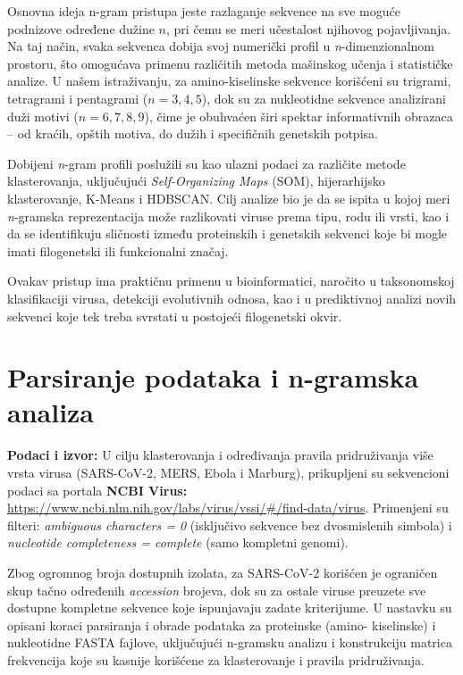 \documentclass[a4paper,12pt]{article}
\begin{document}
Osnovna ideja n-gram pristupa jeste razlaganje sekvence na sve moguće podnizove određene dužine $n$, pri čemu se meri učestalost njihovog pojavljivanja. 
Na taj način, svaka sekvenca dobija svoj numerički profil u \emph{n}-dimenzionalnom prostoru, što omogućava primenu različitih metoda mašinskog učenja i statističke analize.
U našem istraživanju, za amino-kiselinske sekvence korišćeni su trigrami, tetragrami i pentagrami ($n = 3,4,5$), dok su za nukleotidne sekvence analizirani duži motivi ($n = 6,7,8,9$), 
čime je obuhvaćen širi spektar informativnih obrazaca – od kraćih, opštih motiva, do dužih i specifičnih genetskih potpisa.

Dobijeni \emph{n}-gram profili poslužili su kao ulazni podaci za različite metode klasterovanja, uključujući \textit{Self-Organizing Maps} (SOM), hijerarhijsko klasterovanje, K-Means i HDBSCAN. 
Cilj analize bio je da se ispita u kojoj meri \emph{n}-gramska reprezentacija može razlikovati viruse prema tipu, rodu ili vrsti, kao i da se identifikuju sličnosti između proteinskih i genetskih sekvenci 
koje bi mogle imati filogenetski ili funkcionalni značaj.

Ovakav pristup ima praktičnu primenu u bioinformatici, naročito u taksonomskoj klasifikaciji virusa, detekciji evolutivnih odnosa, kao i u prediktivnoj analizi novih sekvenci koje tek treba svrstati u postojeći filogenetski okvir.
\newpage
\section{Parsiranje podataka i n-gramska analiza}
\textbf{Podaci i izvor:} U cilju klasterovanja i određivanja pravila pridruživanja više vrsta virusa (SARS-CoV-2, MERS, Ebola i Marburg), prikupljeni su sekvencioni podaci sa portala \textbf{NCBI Virus:} \url{https://www.ncbi.nlm.nih.gov/labs/virus/vssi/#/find-data/virus}. Primenjeni su filteri: \textit{ambiguous characters = 0} (isključivo
sekvence bez dvosmislenih simbola) i \textit{nucleotide completeness = complete} (samo kompletni genomi).

Zbog ogromnog broja dostupnih izolata, za SARS-CoV-2 korišćen je ograničen skup tačno određenih
\textit{accession} brojeva, dok su za ostale viruse preuzete sve dostupne kompletne sekvence koje ispunjavaju
zadate kriterijume. U nastavku su opisani koraci parsiranja i obrade podataka za proteinske (amino-
kiselinske) i nukleotidne FASTA fajlove, uključujući n-gramsku analizu i konstrukciju matrica frekvencija koje
su kasnije korišćene za klasterovanje i pravila pridruživanja.
\end{document}
